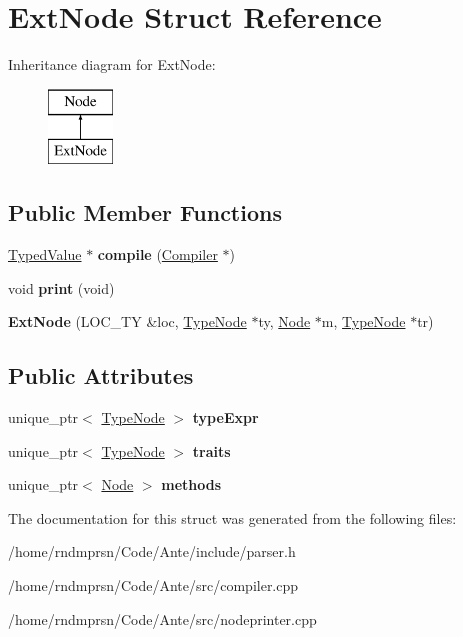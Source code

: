 \hypertarget{structExtNode}{}\section{Ext\+Node Struct Reference}
\label{structExtNode}
Inheritance diagram for Ext\+Node\+:\begin{figure}[H]
\begin{center}
\leavevmode
\includegraphics[height=2.000000cm]{structExtNode}
\end{center}
\end{figure}
\subsection*{Public Member Functions}
\begin{DoxyCompactItemize}
\item 
\mbox{\label{structExtNode_a7aa980725014699b24c0c6951e60970d}} 
\hyperlink{structTypedValue}{Typed\+Value} $\ast$ {\bfseries compile} (\hyperlink{structante_1_1Compiler}{Compiler} $\ast$)
\item 
\mbox{\label{structExtNode_aa8e08824d2e26ff993b3bf8c30b1599c}} 
void {\bfseries print} (void)
\item 
\mbox{\label{structExtNode_ae811439fce2c6fda3cd15fc57b1eb870}} 
{\bfseries Ext\+Node} (L\+O\+C\+\_\+\+TY \&loc, \hyperlink{structTypeNode}{Type\+Node} $\ast$ty, \hyperlink{structNode}{Node} $\ast$m, \hyperlink{structTypeNode}{Type\+Node} $\ast$tr)
\end{DoxyCompactItemize}
\subsection*{Public Attributes}
\begin{DoxyCompactItemize}
\item 
\mbox{\label{structExtNode_a3ff2865fc90c06b93e80374c2eba1258}} 
unique\+\_\+ptr$<$ \hyperlink{structTypeNode}{Type\+Node} $>$ {\bfseries type\+Expr}
\item 
\mbox{\label{structExtNode_aad3e18a5076b0b63a532186a6db62498}} 
unique\+\_\+ptr$<$ \hyperlink{structTypeNode}{Type\+Node} $>$ {\bfseries traits}
\item 
\mbox{\label{structExtNode_afbcc8838b42932c0c664f2c34898c885}} 
unique\+\_\+ptr$<$ \hyperlink{structNode}{Node} $>$ {\bfseries methods}
\end{DoxyCompactItemize}


The documentation for this struct was generated from the following files\+:\begin{DoxyCompactItemize}
\item 
/home/rndmprsn/\+Code/\+Ante/include/parser.\+h\item 
/home/rndmprsn/\+Code/\+Ante/src/compiler.\+cpp\item 
/home/rndmprsn/\+Code/\+Ante/src/nodeprinter.\+cpp\end{DoxyCompactItemize}
